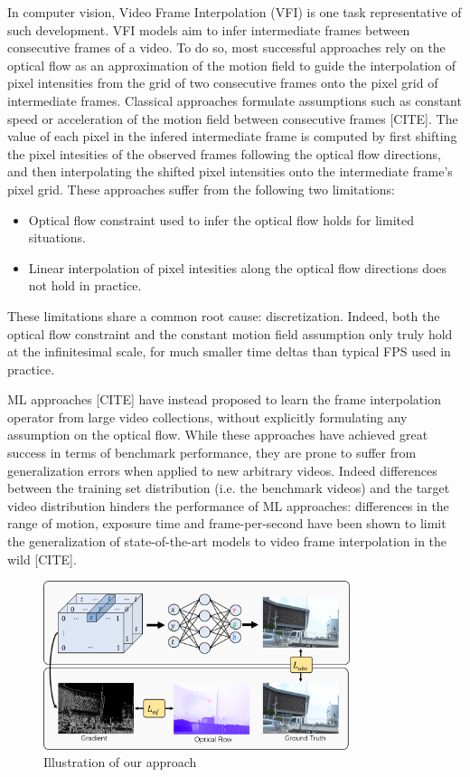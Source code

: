 \documentclass{article}
\begin{document}
In computer vision, Video Frame Interpolation (VFI) is one task representative of such development.
VFI models aim to infer intermediate frames between consecutive frames of a video.
To do so, most successful approaches rely on the optical flow as an approximation of the motion field
to guide the interpolation of pixel intensities from the grid of two consecutive frames onto the pixel grid of intermediate frames.
Classical approaches formulate assumptions such as constant speed or acceleration of the motion field between consecutive frames [CITE].
The value of each pixel in the infered intermediate frame is computed by first shifting the pixel intesities of the observed frames following the 
optical flow directions, and then interpolating the shifted pixel intensities onto the intermediate frame's pixel grid.
These approaches suffer from the following two limitations:

\begin{itemize}
\item Optical flow constraint used to infer the optical flow holds for limited situations. %
\item Linear interpolation of pixel intesities along the optical flow directions does not hold in practice. %
\end{itemize}

These limitations share a common root cause: discretization.
Indeed, both the optical flow constraint and the constant motion field assumption only truly hold at the infinitesimal scale, 
for much smaller time deltas than typical FPS used in practice.

ML approaches [CITE] have instead proposed to learn the frame interpolation operator from large video collections, 
without explicitly formulating any assumption on the optical flow. 
While these approaches have achieved great success in terms of benchmark performance,
they are prone to suffer from generalization errors when applied to new arbitrary videos. %
Indeed differences between the training set distribution (i.e. the benchmark videos) and the target video distribution hinders the performance of ML approaches:
differences in the range of motion, exposure time and frame-per-second have been shown to limit the
generalization of state-of-the-art models to video frame interpolation in the wild [CITE]. %

\begin{figure}[h]
\centering
\includegraphics[width=0.8\textwidth]{Method}
\caption{Illustration of our approach}
\end{figure}
\end{document}
